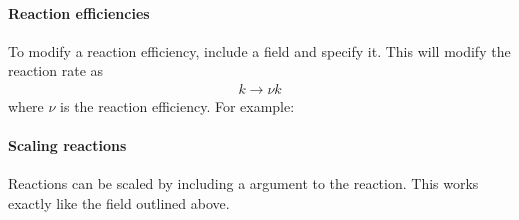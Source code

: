 \documentclass[letterpaper,10pt,english]{sphinxmanual}
\begin{document}
\paragraph{Reaction efficiencies}
\label{\detokenize{Applications/CdrPlasmaModel:reaction-efficiencies}}
\sphinxAtStartPar
To modify a reaction efficiency, include a field  and specify it.
This will modify the reaction rate as
\begin{equation*}
\begin{split}k \rightarrow \nu k\end{split}
\end{equation*}
\sphinxAtStartPar
where \(\nu\) is the reaction efficiency.
For example:

\begin{sphinxVerbatim}[commandchars=\\\{\},formatcom=\scriptsize]
  \PYG{p}{[}
       
       
       
       
       
       
       
       
       
       
       
  \PYG{p}{]}
\end{sphinxVerbatim}


\paragraph{Scaling reactions}
\label{\detokenize{Applications/CdrPlasmaModel:scaling-reactions}}
\sphinxAtStartPar
Reactions can be scaled by including a  argument to the reaction.
This works exactly like the  field outlined above.
\end{document}
